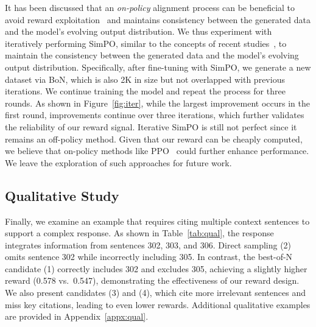 It has been discussed that an \emph{on-policy} alignment process can be beneficial to avoid reward exploitation~\citep{bai2022training} and maintains consistency between the generated data and the model’s evolving output distribution.
We thus experiment with iteratively performing SimPO, similar to the concepts of recent studies~\citep{pang2024iterative, yasunaga2024alma}, to maintain the consistency between the generated data and the model’s evolving output distribution. 
Specifically, after fine-tuning with SimPO, we generate a new dataset via BoN, which is also 2K in size but not overlapped with previous iterations. We continue training the model and repeat the process for three rounds.
As shown in Figure~\ref{fig:iter}, while the largest improvement occurs in the first round, improvements continue over three iterations, which further validates the reliability of our reward signal.
Iterative SimPO is still not perfect since it remains an off-policy method. Given that our reward can be cheaply computed, we believe that on-policy methods like PPO~\citep{schulman2017proximal} could further enhance performance. We leave the exploration of such approaches for future work.

\subsection{Qualitative Study}

Finally, we examine an example that requires citing multiple context sentences to support a complex response. As shown in Table~\ref{tab:qual}, the response integrates information from sentences 302, 303, and 306.
Direct sampling (2) omits sentence 302 while incorrectly including 305. In contrast, the best-of-N candidate (1) correctly includes 302 and excludes 305, achieving a slightly higher reward (0.578 vs.\ 0.547), demonstrating the effectiveness of our reward design. We also present candidates (3) and (4), which cite more irrelevant sentences and miss key citations, leading to even lower rewards. Additional qualitative examples are provided in Appendix~\ref{appx:qual}.


